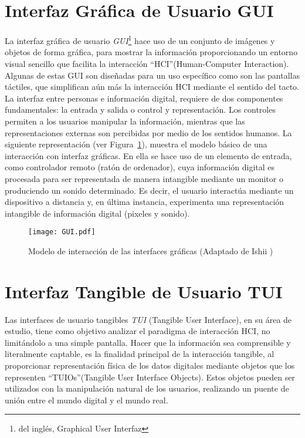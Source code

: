 \section{Interfaz Gráfica de Usuario GUI}
La interfaz gráfica de usuario \emph{GUI}\footnote{del inglés, Graphical User Interfaz} hace uso de un conjunto de imágenes y objetos de forma gráfica, para mostrar la información proporcionando un entorno visual sencillo que facilita la interacción “HCI”(Human-Computer Interaction). Algunas de estas GUI son diseñadas para un uso específico como son las pantallas táctiles, que simplifican aún más la interacción HCI mediante el sentido del tacto.
La interfaz entre personas e información digital, requiere de dos componentes fundamentales: la entrada y salida o control y representación. Los controles permiten a los usuarios manipular la información, mientras que las representaciones externas son percibidas por medio de los sentidos humanos. La siguiente representación (ver Figura~\ref{fig:GUI}), muestra el modelo básico de una interacción con interfaz gráficas. En ella se hace uso de un elemento de entrada, como controlador remoto (ratón de ordenador), cuya información digital es procesada para ser representada de manera intangible mediante un monitor o produciendo un sonido determinado. Es decir, el usuario interactúa mediante un dispositivo a distancia y, en última instancia, experimenta una representación intangible de información digital (pixeles y sonido).

\begin{figure}[!h]
\begin{center}
\texttt{[image: GUI.pdf]}
\caption{Modelo de interacción de las interfaces gráficas (Adaptado de Ishii \cite{Ishii})}
\label{fig:GUI}
\end{center}
\end{figure}

\section{Interfaz Tangible de Usuario TUI}
Las interfaces de usuario tangibles \emph{TUI} (Tangible User Interface), en su área de estudio, tiene como objetivo analizar el paradigma de interacción HCI, no limitándolo a una simple pantalla. Hacer que la información sea comprensible y literalmente captable, es la finalidad principal de la interacción tangible, al proporcionar representación física de los datos digitales mediante objetos que los representen “TUIOs”(Tangible User Interface Objects). Estos objetos pueden ser utilizados con la manipulación natural de los usuarios, realizando un puente de unión entre el mundo digital y el mundo real.

